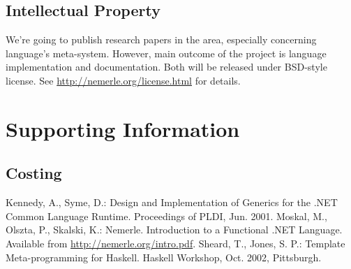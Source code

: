 \documentclass[a4paper,11pt]{article}
\begin{document}
\subsection{Intellectual Property}

We're going to publish research papers in the area, especially concerning
language's meta-system. However, main outcome of the project
is language implementation and documentation. Both will be released
under BSD-style license. See \url{http://nemerle.org/license.html}
for details.


\section{Supporting Information}


\subsection{Costing}




\begin{thebibliography}{22}
Kennedy, A., Syme, D.:
Design and Implementation of Generics for the .NET Common Language Runtime.
Proceedings of PLDI, Jun. 2001.
Moskal, M., Olszta, P., Skalski, K.:
Nemerle. Introduction to a Functional .NET Language.
Available from \url{http://nemerle.org/intro.pdf}.
Sheard, T., Jones, S. P.:
Template Meta-programming for Haskell.
Haskell Workshop, Oct. 2002, Pittsburgh.
\end{thebibliography}
\end{document}
